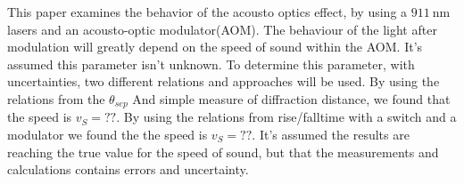 \documentclass[main]{subfiles}
\begin{document}
This paper examines the behavior of the acousto optics effect, by using a $\SI{911}{\nano\meter}$ lasers and  an acousto-optic modulator(AOM). The behaviour of the light after modulation will greatly depend on the speed of sound within the AOM. It’s assumed this parameter isn’t unknown. To determine this parameter, with uncertainties, two different relations and approaches will be used. By using the relations from the $\theta_{sep}$ And simple measure of diffraction distance, we found that the speed is $v_S = ??$. By using the relations from rise/falltime with a switch and a modulator we found the the speed is $v_S = ??$. It’s assumed the results are reaching the true value for the speed of sound, but that the measurements and calculations contains errors and uncertainty.
\end{document}
